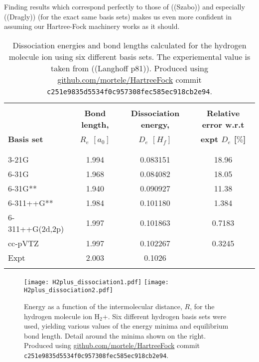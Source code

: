 \documentclass[../../master.tex]{subfiles}
\begin{document}
Finding results which correspond perfectly to those of ((Szabo)) and especially ((Dragly)) (for the exact same basis sets) makes us even more confident in assuming our Hartree-Fock machinery works as it should. 









\begin{table}
\setlength\extrarowheight{2pt}
\begin{tabularx}{\textwidth}{X *{3}{S[table-format=-1.3,table-space-text-post=***]}}
\hline
\hline
\\[-0.9em]
& \textbf{Bond length,}& \textbf{Dissociation energy,} & \textbf{Relative error w.r.t} 
\\
\textbf{Basis set} & \textbf{\phantom{----.}$R_e$ $[a_0]$} & \textbf{\phantom{---------.}$D_e$ $[H_f]$} & \textbf{\phantom{------}expt $D_e$ [$\%$]} 
\\
\\[-0.9em]
\hline
\\[-0.9em]
3-21G           & 1.994 & 0.083151 & 18.96        \\
6-31G           & 1.968 & 0.084082 & 18.05        \\
6-31G**         & 1.940 & 0.090927 & 11.38        \\
6-311++G**      & 1.984 & 0.101180 & 1.384        \\
6-311++G(2d,2p) & 1.997 & 0.101863 & 0.7183       \\
cc-pVTZ         & 1.997 & 0.102267 & 0.3245       \\
Expt            & 2.003 & 0.1026   &              \\ 
\\[-0.9em]
\hline
\end{tabularx}
\caption{Dissociation energies and bond lengths calculated for the hydrogen molecule ion  using six different basis sets. The experiemental value is taken from  ((Langhoff p81)). Produced using \url{github.com/mortele/HartreeFock} commit \texttt{c251e9835d5534f0c957308fec585ec918cb2e94}. \label{tab:hfv4}}
\end{table}




\begin{figure}
\centering
\texttt{[image: H2plus\_dissociation1.pdf]}
\texttt{[image: H2plus\_dissociation2.pdf]}
\caption{Energy as a function of the intermolecular distance, $R$, for the hydrogen molecule ion H${}_2$+. Six different hydrogen basis sets were used, yielding various values of the energy minima and equilibrium bond length. Detail around the minima shown on the right. Produced using \url{github.com/mortele/HartreeFock} commit \texttt{c251e9835d5534f0c957308fec585ec918cb2e94}. \label{fig:h2plus_dissociation}}
\end{figure}
\end{document}
